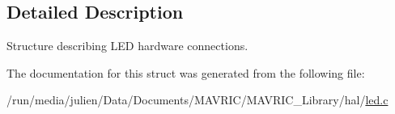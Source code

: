 \subsection{Detailed Description}
Structure describing L\+E\+D hardware connections. 

The documentation for this struct was generated from the following file\+:\begin{DoxyCompactItemize}
\item 
/run/media/julien/\+Data/\+Documents/\+M\+A\+V\+R\+I\+C/\+M\+A\+V\+R\+I\+C\+\_\+\+Library/hal/\hyperlink{led_8c}{led.\+c}\end{DoxyCompactItemize}
